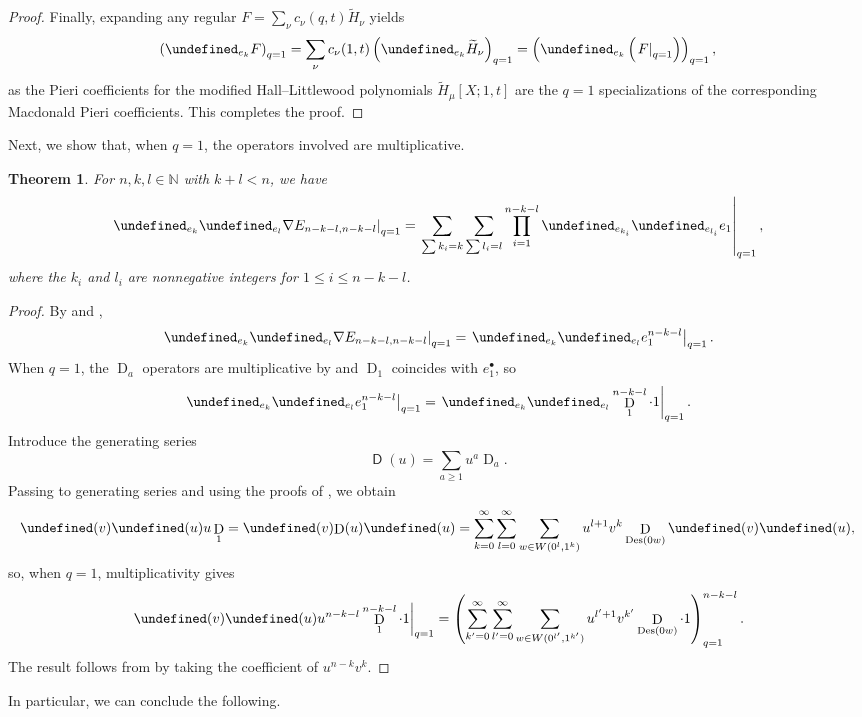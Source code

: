 \documentclass[reqno]{amsart}
\theoremstyle{plain}
\newtheorem{theorem}{Theorem}[section]
\theoremstyle{definition}
\theoremstyle{remark}
\DeclareMathOperator{\D}{D}
\DeclareMathOperator{\Des}{Des}
\newcommand{\Ht}{\widetilde{H}}
\let\oldTheta\Theta
\let\Theta\undefined
\DeclareMathOperator{\Theta}{\oldTheta}
\newcommand{\<}{\langle}
\renewcommand{\>}{\rangle}
\begin{document}
\begin{proof}
    Finally, expanding any regular $F = \sum_\nu c_\nu(q,t) \Ht_\nu$ yields 
    \[ \left( \Theta_{e_k} F \right)_{q=1} = \sum_\nu c_\nu(1,t) \left( \Theta_{e_k} \Ht_\nu \right)_{q=1} = \left( \Theta_{e_k} \left( \left. F \right\rvert_{q=1} \right) \right)_{q=1}, \]
    as the Pieri coefficients for the modified Hall--Littlewood polynomials $\Ht_\mu[X;1,t]$ are the $q=1$ specializations of the corresponding Macdonald Pieri coefficients. This completes the proof.
\end{proof}


Next, we show that, when $q=1$, the operators involved are multiplicative. 

\begin{theorem}
    \label{thm:theta_q1_multiplicative}
    For $n,k,l \in \mathbb{N}$ with $k+l < n$, we have \[ \left. \Theta_{e_k} \Theta_{e_l} \nabla E_{n-k-l, n-k-l} \right\rvert_{q=1} = \left. \sum_{\sum k_i = k} \sum_{\sum l_i = l} \prod_{i=1}^{n-k-l} \Theta_{e_{k_i}} \Theta_{e_{l_i}} e_1 \right\rvert_{q=1}, \]
    where the $k_i$ and $l_i$ are nonnegative integers for $1 \leq i \leq n-k-l$.  
\end{theorem}

\begin{proof}
    By  and ,
    \[ \left. \Theta_{e_k} \Theta_{e_l} \nabla E_{n-k-l, n-k-l} \right\rvert_{q=1} = \left. \Theta_{e_k} \Theta_{e_l} e_1^{n-k-l} \right\rvert_{q=1}. \]
    When $q=1$, the $\D_a$ operators are multiplicative by  and $\D_1$ coincides with $e_1^\bullet$, so
    \[ \left. \Theta_{e_k} \Theta_{e_l} e_1^{n-k-l} \right\rvert_{q=1} = \left. \Theta_{e_k} \Theta_{e_l} \D_1^{n-k-l} \cdot 1\right\rvert_{q=1}. \]
    Introduce the generating series \[ \mathsf{\D}(u) = \sum_{a \geq 1} u^a \D_a. \] Passing to generating series and using the proofs of , we obtain
    \[ \Theta(v) \Theta(u) u \D_1 = \Theta(v) \mathsf{\D}(u) \Theta(u) = \sum_{k=0}^\infty \sum_{l=0}^\infty \sum_{w \in W(0^l, 1^k)} u^{l+1} v^k \D_{\Des(0w)} \Theta(v) \Theta(u), \]
    so, when $q=1$, multiplicativity gives
    \[ \left. \Theta(v) \Theta(u) u^{n-k-l} \D_1^{n-k-l} \cdot 1 \right\rvert_{q=1} = \left( \sum_{k'=0}^\infty \sum_{l'=0}^\infty \sum_{w \in W(0^{l'}, 1^{k'})} u^{l'+1} v^{k'} \D_{\Des(0w)} \cdot 1 \right)_{q=1}^{n-k-l}. \]
    The result follows from  by taking the coefficient of $u^{n-k} v^k$.
\end{proof}

In particular, we can conclude the following.
\end{document}
